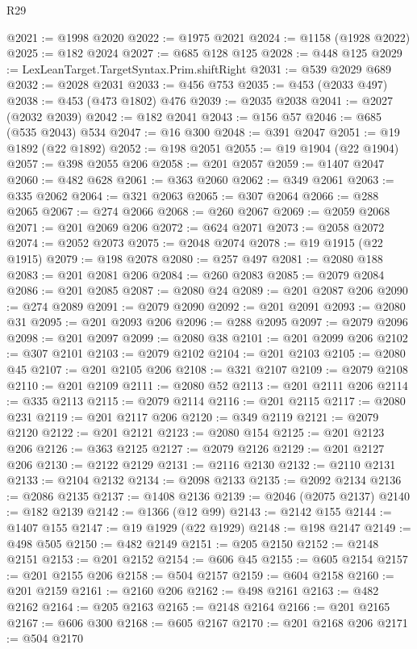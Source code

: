 \begin{lexlean}{R29}
\begin{coremodule}
@2021 := @1998 @2020
@2022 := @1975 @2021
@2024 := @1158 (@1928 @2022)
@2025 := @182 @2024
@2027 := @685 @128 @125
@2028 := @448 @125
@2029 := LexLeanTarget.TargetSyntax.Prim.shiftRight
@2031 := @539 @2029 @689
@2032 := @2028 @2031
@2033 := @456 @753
@2035 := @453 (@2033 @497)
@2038 := @453 (@473 @1802) @476
@2039 := @2035 @2038
@2041 := @2027 (@2032 @2039)
@2042 := @182 @2041
@2043 := @156 @57
@2046 := @685 (@535 @2043) @534
@2047 := @16 @300
@2048 := @391 @2047
@2051 := @19 @1892 (@22 @1892)
@2052 := @198 @2051
@2055 := @19 @1904 (@22 @1904)
@2057 := @398 @2055 @206
@2058 := @201 @2057
@2059 := @1407 @2047
@2060 := @482 @628
@2061 := @363 @2060
@2062 := @349 @2061
@2063 := @335 @2062
@2064 := @321 @2063
@2065 := @307 @2064
@2066 := @288 @2065
@2067 := @274 @2066
@2068 := @260 @2067
@2069 := @2059 @2068
@2071 := @201 @2069 @206
@2072 := @624 @2071
@2073 := @2058 @2072
@2074 := @2052 @2073
@2075 := @2048 @2074
@2078 := @19 @1915 (@22 @1915)
@2079 := @198 @2078
@2080 := @257 @497
@2081 := @2080 @188
@2083 := @201 @2081 @206
@2084 := @260 @2083
@2085 := @2079 @2084
@2086 := @201 @2085
@2087 := @2080 @24
@2089 := @201 @2087 @206
@2090 := @274 @2089
@2091 := @2079 @2090
@2092 := @201 @2091
@2093 := @2080 @31
@2095 := @201 @2093 @206
@2096 := @288 @2095
@2097 := @2079 @2096
@2098 := @201 @2097
@2099 := @2080 @38
@2101 := @201 @2099 @206
@2102 := @307 @2101
@2103 := @2079 @2102
@2104 := @201 @2103
@2105 := @2080 @45
@2107 := @201 @2105 @206
@2108 := @321 @2107
@2109 := @2079 @2108
@2110 := @201 @2109
@2111 := @2080 @52
@2113 := @201 @2111 @206
@2114 := @335 @2113
@2115 := @2079 @2114
@2116 := @201 @2115
@2117 := @2080 @231
@2119 := @201 @2117 @206
@2120 := @349 @2119
@2121 := @2079 @2120
@2122 := @201 @2121
@2123 := @2080 @154
@2125 := @201 @2123 @206
@2126 := @363 @2125
@2127 := @2079 @2126
@2129 := @201 @2127 @206
@2130 := @2122 @2129
@2131 := @2116 @2130
@2132 := @2110 @2131
@2133 := @2104 @2132
@2134 := @2098 @2133
@2135 := @2092 @2134
@2136 := @2086 @2135
@2137 := @1408 @2136
@2139 := @2046 (@2075 @2137)
@2140 := @182 @2139
@2142 := @1366 (@12 @99)
@2143 := @2142 @155
@2144 := @1407 @155
@2147 := @19 @1929 (@22 @1929)
@2148 := @198 @2147
@2149 := @498 @505
@2150 := @482 @2149
@2151 := @205 @2150
@2152 := @2148 @2151
@2153 := @201 @2152
@2154 := @606 @45
@2155 := @605 @2154
@2157 := @201 @2155 @206
@2158 := @504 @2157
@2159 := @604 @2158
@2160 := @201 @2159
@2161 := @2160 @206
@2162 := @498 @2161
@2163 := @482 @2162
@2164 := @205 @2163
@2165 := @2148 @2164
@2166 := @201 @2165
@2167 := @606 @300
@2168 := @605 @2167
@2170 := @201 @2168 @206
@2171 := @504 @2170

\end{coremodule}
\end{lexlean}
